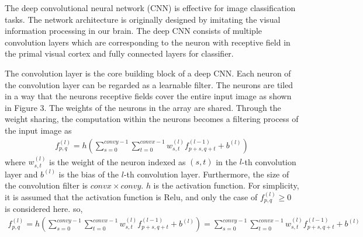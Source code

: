 \documentclass[a4paper,12pt]{article}
\begin{document}




The deep convolutional neural network (CNN) is effective for image classification tasks.
The network architecture is originally designed by imitating the visual information processing in our brain. 
The deep CNN consists of multiple convolution layers which are corresponding to the neuron with receptive field in the primal visual cortex and fully connected layers for classifier.\par

The convolution layer is the core building block of a deep CNN. Each neuron of the convolution layer can be regarded as a learnable filter. The neurons are tiled in a way that the neurons receptive fields cover the entire input image as shown in Figure 3. The weights of the neurons in the array are shared. Through the weight sharing, the computation within the neurons becomes a filtering process of the input image as
\begin{align}
f_{p,q}^{(l)}=h(\sum^{convy-1}_{s=0}\sum^{convx-1}_{t=0}w^{(l)}_{s,t}f^{(l-1)}_{p+s, q+t}+b^{(l)})
\end{align}
where $w^{(l)}_{s,t}$ is the weight of the neuron indexed as $(s,t)$ in the $l$-th convolution layer and $b^{(l)}$ is the bias of the $l$-th convolution layer. Furthermore, the size of the convolution filter is $convx \times convy$. $h$ is the activation function. For simplicity, it is assumed that the activation function is Relu, and only the case of $f^{(l)}_{p,q} \geq 0$ is considered here. so,
\begin{align}
f_{p,q}^{(l)}=h(\sum^{convy-1}_{s=0}\sum^{convx-1}_{t=0}w^{(l)}_{s,t}f^{(l-1)}_{p+s, q+t}+b^{(l)})=\sum^{convy-1}_{s=0}\sum^{convx-1}_{t=0}w^{(l)}_{s,t}f^{(l-1)}_{p+s, q+t}+b^{(l)}
\end{align}
\end{document}

